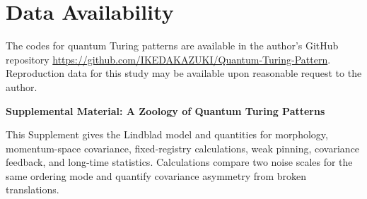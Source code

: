 \documentclass[aps,prl,twocolumn,superscriptaddress,nofootinbib,floatfix]{revtex4-2}
\begin{document}
\section*{Data Availability}
The codes for quantum Turing patterns are available in the author's GitHub repository \url{https://github.com/IKEDAKAZUKI/Quantum-Turing-Pattern}. Reproduction data for this study may be available upon reasonable request to the author.

\FloatBarrier
\renewcommand{\bibfont}{\footnotesize}
\setlength{\bibsep}{0pt plus 0.2pt}



\clearpage
\onecolumngrid
\begin{center}
 {\large\bfseries Supplemental Material: A Zoology of Quantum Turing Patterns}
\end{center}


This Supplement gives the Lindblad model and quantities for morphology, momentum-space covariance, fixed-registry calculations, weak pinning, covariance feedback, and long-time statistics. Calculations compare two noise scales for the same ordering mode and quantify covariance asymmetry from broken translations.
\end{document}
